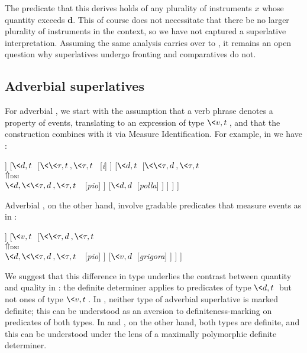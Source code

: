 \documentclass[output=paper
,modfonts
,nonflat]{langsci/langscibook}
\begin{document}
The predicate that this derives holds of any plurality of instruments $x$ whose quantity exceeds $\textbf{d}$. This of course does not necessitate that there be no larger plurality of instruments in the context, so we have not captured a superlative interpretation. Assuming the same analysis carries over to , it remains an open question why superlatives undergo fronting and comparatives do not.

\subsection{Adverbial superlatives}

For adverbial , we start with the assumption that a verb phrase denotes a property of events, translating to an expression of type $\<v,t\>$, and that the  construction combines with it via Measure Identification. For example, in  we have :

\ea \label{ex:coppockstrand:107} 
\begin{forest}
	[{$\<v,t\>$\\(by Measure Identification)}
		[{$\<v,t\>$} [VP]
		]
		[{$\<d,t\>$}
			[{$\<\<\tau,t\>,\<\tau,t\>\>$} [\textit{i}]
			]
			[{$\<d,t\>$}
				[{$\<\<\tau,d\>,\<\tau,t\>\>$\\$\Uparrow_{\textsc{dni}}$\\$\<d,\<\<\tau,d\>,\<\tau,t\>\>\>$} [\textit{pio}]
				]
				[{$\<d,d\>$} [\textit{polla}]
				]
			]
		]
	]
\end{forest}
\z 

Adverbial , on the other hand, involve gradable predicates that measure events as in : 

\ea \label{ex:coppockstrand:108}
\begin{forest}
	[{$\<v,t\>$\\(by Predicate Modification)}
		[{$\<v,t\>$} [VP]
		]
		[{$\<v,t\>$}
			[{$\<\<\tau,d\>,\<\tau,t\>\>$\\$\Uparrow_{\textsc{dni}}$\\$\<d,\<\<\tau,d\>,\<\tau,t\>\>\>$} [\textit{pio}]
			]
			[{$\<v,d\>$} [\textit{grigora}]
			]
		]
	]
\end{forest}
\z 

We suggest that this difference in type underlies the contrast between quantity and quality  in : the  definite determiner applies to predicates of type $\<d,t\>$ but not ones of type $\<v,t\>$.  In , neither type of adverbial superlative is marked definite; this can be understood as an aversion to definiteness-marking on predicates of both types. In  and , on the other hand, both types are definite, and this can be understood under the  lens of a maximally polymorphic definite determiner.
\end{document}
